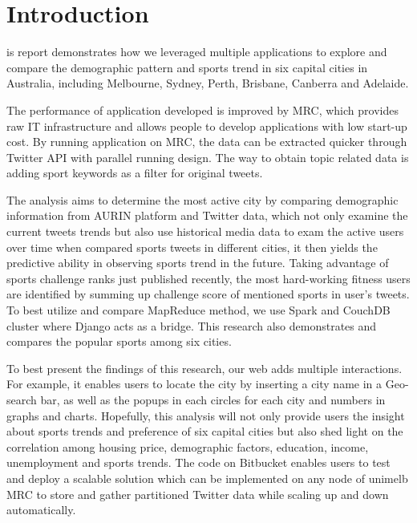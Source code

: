 \section{Introduction}

is report demonstrates how we leveraged multiple applications to explore and compare the demographic pattern and sports trend in six capital cities in Australia, including Melbourne, Sydney, Perth, Brisbane, Canberra and Adelaide. 

 The performance of application developed is improved by MRC, which provides raw IT infrastructure and allows people to develop applications with low start-up cost. By running application on MRC, the data can be extracted quicker through Twitter API with parallel running design. The way to obtain topic related data is adding sport keywords as a filter for original tweets.
 
 The analysis aims to determine the most active city by comparing demographic information from AURIN platform and Twitter data, which not only examine the current tweets trends but also use historical media data to exam the active users over time when compared sports tweets in different cities, it then yields the predictive ability in observing sports trend in the future. Taking advantage of sports challenge ranks just published recently, the most hard-working fitness users are identified by summing up challenge score of mentioned sports in user's tweets. To best utilize and compare MapReduce method, we use Spark and CouchDB cluster where Django acts as a bridge. This research also demonstrates and compares the popular sports among six cities. 
 
To best present the findings of this research, our web adds multiple interactions. For example, it enables users to locate the city by inserting a city name in a Geo-search bar, as well as the popups in each circles for each city and numbers in graphs and charts. Hopefully, this analysis will not only provide users the insight about sports trends and preference  of six capital cities but also shed light on the correlation among housing price, demographic factors, education, income, unemployment and sports trends. The code on Bitbucket enables users to test and deploy a scalable solution which can be implemented on any node of unimelb MRC to store and gather partitioned Twitter data while scaling up and down automatically.